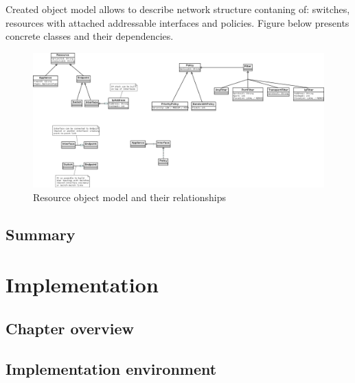 \documentclass[11pt]{book}
\begin{document}
    Created object model allows to describe network structure contaning of: switches, resources with attached addressable 
    interfaces and policies. Figure below presents concrete classes and their dependencies.    

        \begin{figure}[H]
          \begin{center}
            \includegraphics[angle=90, height=0.9\textwidth]{img/impl/resource-object-model.png}
          \end{center}
          \caption{Resource object model and their relationships}
        \end{figure}        


    \section*{Summary}


  \chapter{Implementation}
    
    \section*{Chapter overview}


    \section{Implementation environment}
\end{document}
